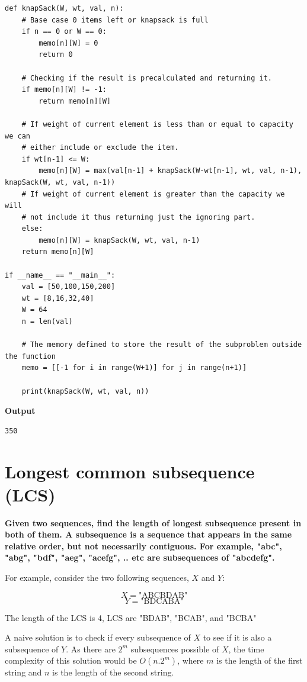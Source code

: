 \documentclass[a4paper,11pt]{book}
\begin{document}
\begin{lstlisting}
def knapSack(W, wt, val, n):
    # Base case 0 items left or knapsack is full 
    if n == 0 or W == 0:
        memo[n][W] = 0
        return 0

    # Checking if the result is precalculated and returning it.
    if memo[n][W] != -1:
        return memo[n][W]

    # If weight of current element is less than or equal to capacity we can 
    # either include or exclude the item.
    if wt[n-1] <= W:
        memo[n][W] = max(val[n-1] + knapSack(W-wt[n-1], wt, val, n-1), knapSack(W, wt, val, n-1))
    # If weight of current element is greater than the capacity we will
    # not include it thus returning just the ignoring part. 
    else:
        memo[n][W] = knapSack(W, wt, val, n-1)
    return memo[n][W]

if __name__ == "__main__":
    val = [50,100,150,200]
    wt = [8,16,32,40]
    W = 64
    n = len(val)

    # The memory defined to store the result of the subproblem outside the function
    memo = [[-1 for i in range(W+1)] for j in range(n+1)]

    print(knapSack(W, wt, val, n))
\end{lstlisting}
\textbf{Output}
\begin{lstlisting}
350
\end{lstlisting}

\section{Longest common subsequence (LCS)}

\noindent \textbf{Given two sequences, find the length of longest subsequence present in both of them. A subsequence is a sequence that appears in the same relative order, but not necessarily contiguous. For example, "abc", "abg", "bdf", "aeg", "acefg", .. etc are subsequences of "abcdefg".}

\vspace{5mm}

\noindent For example, consider the two following sequences, $X$ and $Y$:

$$X = \text{"ABCBDAB"}$$
$$Y =  \text{"BDCABA"}$$

\noindent The length of the LCS is 4, LCS are "BDAB", "BCAB", and "BCBA"

\vspace{3mm}

\noindent A naive solution is to check if every subsequence of $X$ to see if it is also a subsequence of $Y$. As there are $2^m$ subsequences possible of $X$, the time complexity of this solution would be $O(n.2^m)$, where $m$ is the length of the first string and $n$ is the length of the second string.
\end{document}
